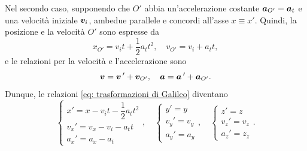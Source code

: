 Nel secondo caso, supponendo che $O'$ abbia un'accelerazione costante $\bm{a}_{O'}=\bm{a}_t$ e una velocità iniziale $\bm{v}_{i}$, ambedue parallele e concordi all'asse $x\equiv x'$. Quindi, la posizione e la velocità $O'$ sono espresse da
\begin{equation}
    x_{O'}=v_it+\frac{1}{2}a_tt^2,\quad v_{O'}=v_i+a_tt,
\end{equation}
e le relazioni per la velocità e l'accelerazione sono
\begin{equation}
    \bm{v}=\bm{v}\,'+\bm{v}_{O'},\quad\bm{a}=\bm{a}\,'+\bm{a}_{O'}.
\end{equation}
Dunque, le relazioni \eqref{eq: trasformazioni di Galileo} diventano
\begin{equation}
    \begin{cases}
        x'=x-v_it-\dfrac{1}{2}a_tt^2 \\
        v_x'=v_x-v_i-a_tt \\
        a_x'=a_x-a_t
    \end{cases},\quad
    \begin{cases}
        y'=y \\
        v_y'=v_y \\
        a_y'=a_y
    \end{cases},\quad
    \begin{cases}
        z'=z \\
        v_z'=v_z \\
        a_z'=z_z
    \end{cases}.
\end{equation}

